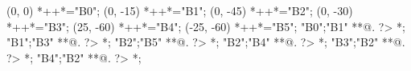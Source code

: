 \begin{scriptsize}
\xy(0, 0)
	*++{}*\frm{-,}="B0";
(0, -15)
	*++{}*\frm{-,}="B1";
(0, -45)
	*++{}*\frm{-,}="B2";
(0, -30)
	*++{}*\frm{-,}="B3";
(25, -60)
	*++{}*\frm{-,}="B4";
(-25, -60)
	*++{}*\frm{-,}="B5";
"B0";"B1" **@{.} ?> *{\dir{>}};
"B1";"B3" **@{.} ?> *{\dir{>}};
"B2";"B5" **@{.} ?> *{\dir{>}};
"B2";"B4" **@{.} ?> *{\dir{>}};
"B3";"B2" **@{.} ?> *{\dir{>}};
"B4";"B2" **@{.} ?> *{\dir{>}};
\endxy
\end{scriptsize}


